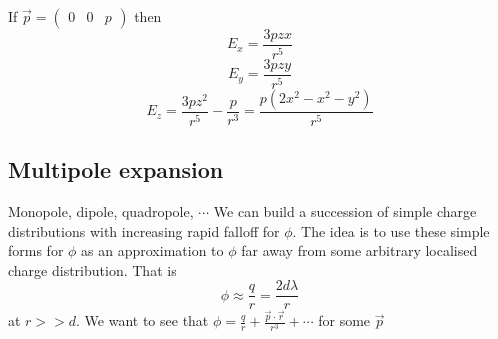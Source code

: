 If $\vec{p} = \begin{pmatrix} 0 & 0 & p \end{pmatrix}$ then $$E_x = \frac{3 p z x}{r^5}$$ $$E_y = \frac{3 p z y}{r^5}$$ $$E_z = \frac{3 p z^2}{r^5} - \frac{p}{r^3} = \frac{p (2x^2 - x^2 - y^2)}{r^5}$$

\subsection{Multipole expansion}

Monopole, dipole, quadropole, $\cdots$ We can build a succession of simple charge distributions with increasing rapid falloff for $\phi$. The idea is to use these simple forms for $\phi$ as an approximation to $\phi$ far away from some arbitrary localised charge distribution. That is $$\phi \approx \frac{q}{r} = \frac{2d \lambda}{r}$$ at $r >> d$. We want to see that $\phi = \frac{q}{r} + \frac{\vec{p}\cdot \vec{r}}{r^3} + \cdots$ for some $\vec{p}$


